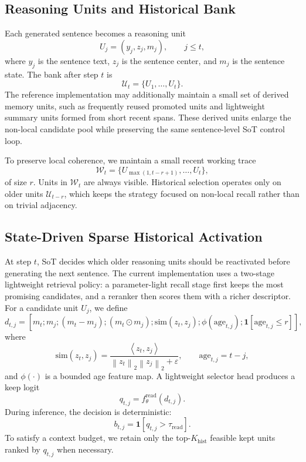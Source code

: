 \documentclass{article}
\newcommand{\norm}[1]{\left\lVert #1 \right\rVert}
\newcommand{\inner}[2]{\left\langle #1, #2 \right\rangle}
\newcommand{\eps}{\varepsilon}
\newcommand{\Ind}{\mathbf{1}}
\begin{document}
\subsection{Reasoning Units and Historical Bank}
\label{sec:memory}
Each generated sentence becomes a reasoning unit
\begin{equation}
 U_j = (y_j, z_j, m_j), \qquad j\le t,
\label{eq:cell}
\end{equation}
where $y_j$ is the sentence text, $z_j$ is the sentence center, and $m_j$ is the sentence state. The bank after step $t$ is
\[
\mathcal{U}_t = \{U_1,\dots,U_t\}.
\]
The reference implementation may additionally maintain a small set of derived memory units, such as frequently reused promoted units and lightweight summary units formed from short recent spans. These derived units enlarge the non-local candidate pool while preserving the same sentence-level SoT control loop.

To preserve local coherence, we maintain a small recent working trace
\[
\mathcal{W}_t = \{U_{\max(1,t-r+1)},\dots,U_t\},
\]
of size $r$. Units in $\mathcal{W}_t$ are always visible. Historical selection operates only on older units $\mathcal{U}_{t-r}$, which keeps the strategy focused on non-local recall rather than on trivial adjacency.

\subsection{State-Driven Sparse Historical Activation}
\label{sec:backlook}
At step $t$, SoT decides which older reasoning units should be reactivated before generating the next sentence. The current implementation uses a two-stage lightweight retrieval policy: a parameter-light recall stage first keeps the most promising candidates, and a reranker then scores them with a richer descriptor. For a candidate unit $U_j$, we define
\begin{equation}
 d_{t,j} = [m_t; m_j; (m_t-m_j); (m_t\odot m_j); \mathrm{sim}(z_t,z_j); \phi(\mathrm{age}_{t,j}); \Ind[\mathrm{age}_{t,j}\le r]],
\label{eq:descriptor}
\end{equation}
where
\[
\mathrm{sim}(z_t,z_j)=\frac{\inner{z_t}{z_j}}{\norm{z_t}_2\norm{z_j}_2+\eps}, \qquad
\mathrm{age}_{t,j}=t-j,
\]
and $\phi(\cdot)$ is a bounded age feature map. A lightweight selector head produces a keep logit
\begin{equation}
 q_{t,j}=f_{\theta}^{\mathrm{read}}(d_{t,j}).
\label{eq:qread}
\end{equation}
During inference, the decision is deterministic:
\begin{equation}
 b_{t,j} = \Ind[q_{t,j}>\tau_{\mathrm{read}}].
\label{eq:binarymask}
\end{equation}
To satisfy a context budget, we retain only the top-$K_{\mathrm{hist}}$ feasible kept units ranked by $q_{t,j}$ when necessary.
\end{document}
